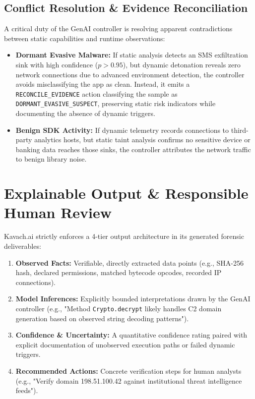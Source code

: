 \documentclass[conference]{IEEEtran}
\begin{document}
\subsection{Conflict Resolution \& Evidence Reconciliation}
A critical duty of the GenAI controller is resolving apparent contradictions between static capabilities and runtime observations:
\begin{itemize}
    \item \textbf{Dormant Evasive Malware:} If static analysis detects an SMS exfiltration sink with high confidence ($p > 0.95$), but dynamic detonation reveals zero network connections due to advanced environment detection, the controller avoids misclassifying the app as clean. Instead, it emits a \texttt{RECONCILE\_EVIDENCE} action classifying the sample as \texttt{DORMANT\_EVASIVE\_SUSPECT}, preserving static risk indicators while documenting the absence of dynamic triggers.
    \item \textbf{Benign SDK Activity:} If dynamic telemetry records connections to third-party analytics hosts, but static taint analysis confirms no sensitive device or banking data reaches those sinks, the controller attributes the network traffic to benign library noise.
\end{itemize}

\section{Explainable Output \& Responsible Human Review}
Kavach.ai strictly enforces a 4-tier output architecture in its generated forensic deliverables:
\begin{enumerate}
    \item \textbf{Observed Facts:} Verifiable, directly extracted data points (e.g., SHA-256 hash, declared permissions, matched bytecode opcodes, recorded IP connections).
    \item \textbf{Model Inferences:} Explicitly bounded interpretations drawn by the GenAI controller (e.g., "Method \texttt{Crypto.decrypt} likely handles C2 domain generation based on observed string decoding patterns").
    \item \textbf{Confidence \& Uncertainty:} A quantitative confidence rating paired with explicit documentation of unobserved execution paths or failed dynamic triggers.
    \item \textbf{Recommended Actions:} Concrete verification steps for human analysts (e.g., "Verify domain 198.51.100.42 against institutional threat intelligence feeds").
\end{enumerate}
\end{document}
